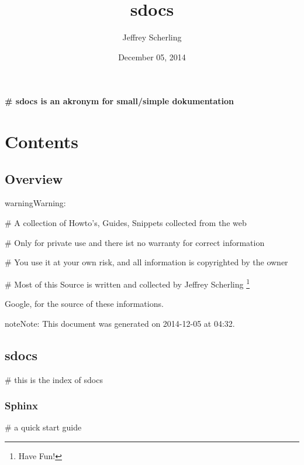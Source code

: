 \documentclass[letterpaper,10pt,english]{sphinxmanual}
\title{sdocs}
\date{December 05, 2014}
\author{Jeffrey Scherling}
\begin{document}
\maketitle
\tableofcontents
{}\label{index::doc}


\textbf{\# sdocs is an akronym for small/simple dokumentation}


\chapter{Contents}
\label{index:welcome-to-sdocs}\label{index:contents}

\section{Overview}
\label{sdocs/overview:overview}\label{sdocs/overview::doc}
\begin{notice}{warning}{Warning:}
\begin{DUlineblock}{0em}
\item[] \# A collection of Howto's, Guides, Snippets collected from the web
\item[] \# Only for private use and there ist no warranty for correct information
\item[] \# You use it at your own risk, and all information is copyrighted by the owner
\item[] \# Most of this Source is written and collected by Jeffrey Scherling \footnote{
Have Fun!
}
\end{DUlineblock}
\end{notice}




Google, for the source of these informations.



\begin{notice}{note}{Note:}
This document was generated on 2014-12-05 at 04:32.
\end{notice}


\section{sdocs}
\label{sdocs/index_sdocs::doc}\label{sdocs/index_sdocs:sdocs}
\# this is the index of sdocs


\subsection{Sphinx}
\label{sdocs/sphinx/sphinx:sphinx}\label{sdocs/sphinx/sphinx::doc}
\# a quick start guide
\end{document}
